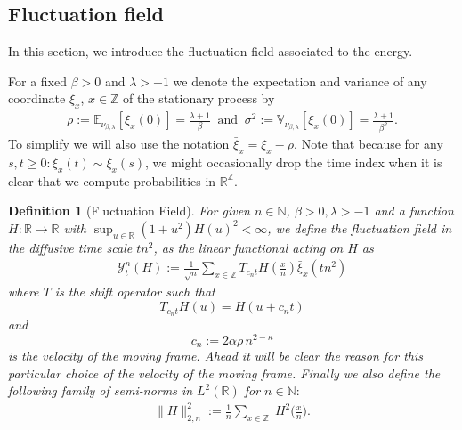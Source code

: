 \documentclass[a4paper, reqno, 12pt]{amsart}
\theoremstyle{plain}
\newtheorem{definition}{Definition}[section]
\theoremstyle{definition}
\newcommand{\parent}[1]{\left( #1 \right)}
\newcommand{\R}{\mathbb{R}}
\newcommand{\Z}{\mathbb{Z}}
\newcommand{\N}{\mathbb{N}}
\begin{document}
\subsection{Fluctuation field}

In this section, we introduce the fluctuation field associated to the energy.

For a fixed $\beta>0$ and $\lambda>-1$ we denote the expectation and variance of any coordinate $\xi_x$, $x\in\Z$ of the stationary process by 
\begin{align}\label{eq:means}
    \rho:=\mathbb{E}_{\nu_{\beta,\lambda}}[\xi_x(0)] = \frac{\lambda+1}{\beta}\ \text{ and }\  \sigma^2 := \mathbb{V}_{\nu_{\beta,\lambda}}[\xi_x(0)] =\frac{\lambda +1 }{\beta ^2}.
\end{align}
To simplify we will also use the notation $\bar\xi_x = \xi_x-\rho$. Note that because for any $s,t\geq 0: \xi_x(t)\sim\xi_x(s)$, we might occasionally drop the time index when it is clear that we compute probabilities in $\R^{\Z}$.


\begin{definition}[Fluctuation Field]
\label{def:notation}
        For given $n\in\N$, $\beta>0, \lambda>-1$ and a function $H:\R\to\R$ with $\sup_{u\in\R}(1+u^2)H(u)^2 <\infty$,
        we define the fluctuation field in the diffusive time scale $tn^2$, as the linear functional acting on $H$ as
    \begin{align*}
        \mathcal{Y}^n_t(H) := \frac{1}{\sqrt{n}}\sum_{x\in\mathbb{Z}} T_{c_n t} H\parent{\tfrac{x}{n}} \bar{\xi}_x(tn^2)
    \end{align*}
    where $T$ is the shift operator such that \begin{equation}
    \label{eq:semigroup}
    T_{c_n t}H(u)=H(u+c_n t) 
    \end{equation}
    and 
    \begin{equation}
        \label{eq:c_n}
    c_n :=  2\alpha\rho \, n^{2-\kappa}
    \end{equation}
    is the velocity of the  moving frame. Ahead it will be clear the reason for this particular choice of the velocity of the moving frame. Finally we also define the following family of semi-norms in $L^2(\R)$ for $n\in\N:$
    \begin{align} \label{eq:discreteL2}
        \|H\|_{2,n}^2:= \frac{1}{n}\sum_{x\in\mathbb{Z}} \;  H^2\big(\tfrac{x}{n}\big).
    \end{align}
\end{definition}
\end{document}
